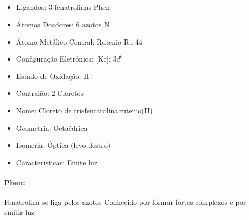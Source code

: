 \documentclass[12pt]{article}
\begin{document}
	\subsection{}
	\begin{itemize}
   
   
   \item Ligandos: 3 fenatrolinas Phen
   
   
   \item Átomos Doadores: 6 azotos N
   
   \item Átomo Metálico Central: Rutenio Ru 44
   
   \item Configuração Eletrónica: [Kr]: $ 3d^6 $
   
   \item Estado de Oxidação: II+
   
   \item Contraião: 2 Cloretos 
   
   \item Nome: Cloreto de trisfenatrolina\,rutenio(II)
   
   \item Geometria: Octaédrica
   
   \item Isomeria: Óptica (levo-destro)

	\item Caracteristicas: Emite luz

	\end{itemize}
	
\paragraph{Phen:}
Fenatrolina  se liga pelos azotos Conhecido por formar fortes complexos e por emitir luz
	
\break

\end{document}
